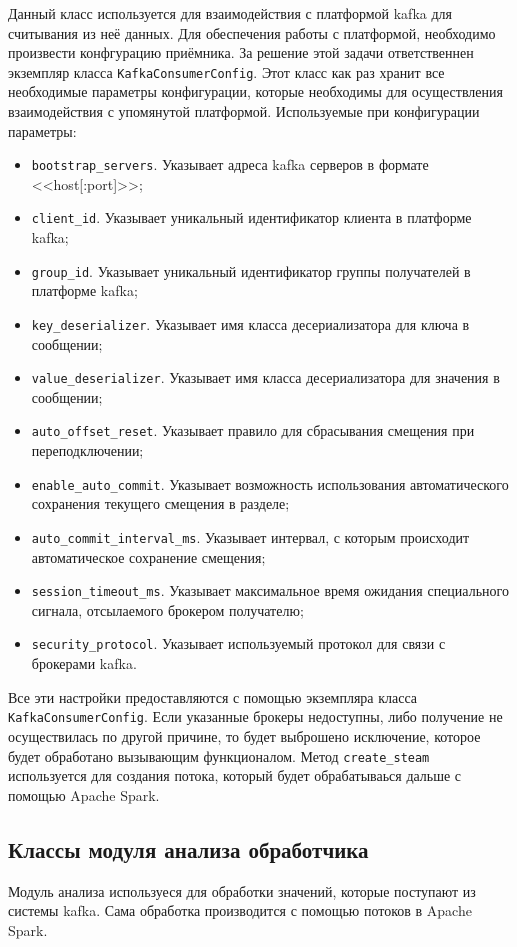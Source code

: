Данный класс используется для взаимодействия с платформой kafka для считывания из неё данных.
Для обеспечения работы с платформой, необходимо произвести конфгурацию приёмника.
За решение этой задачи ответственнен экземпляр класса \texttt{KafkaConsumerConfig}.
Этот класс как раз хранит все необходимые параметры конфигурации, которые необходимы для осуществления взаимодействия с упомянутой платформой.
Используемые при конфигурации параметры:
\begin{itemize}
    \item \texttt{bootstrap\_servers}. Указывает адреса kafka серверов в формате <<host[:port]>>;
    \item \texttt{client\_id}. Указывает уникальный идентификатор клиента в платформе kafka;
    \item \texttt{group\_id}. Указывает уникальный идентификатор группы получателей в платформе kafka;
    \item \texttt{key\_deserializer}. Указывает имя класса десериализатора для ключа в сообщении;
    \item \texttt{value\_deserializer}. Указывает имя класса десериализатора для значения в сообщении;
    \item \texttt{auto\_offset\_reset}. Указывает правило для сбрасывания смещения при переподключении;
    \item \texttt{enable\_auto\_commit}. Указывает возможность использования автоматического сохранения текущего смещения в разделе;
    \item \texttt{auto\_commit\_interval\_ms}. Указывает интервал, с которым происходит автоматическое сохранение смещения;
    \item \texttt{session\_timeout\_ms}. Указывает максимальное время ожидания специального сигнала, отсылаемого брокером получателю;
    \item \texttt{security\_protocol}. Указывает используемый протокол для связи с брокерами kafka.
\end{itemize}

Все эти настройки предоставляются с помощью экземпляра класса \texttt{KafkaConsumerConfig}.
Если указанные брокеры недоступны, либо получение не осуществилась по другой причине, то будет выброшено исключение, которое будет обработано вызывающим функционалом.
Метод \texttt{create\_steam} используется для создания потока, который будет обрабатываься дальше с помощью Apache Spark.


\subsection{Классы модуля анализа обработчика}
Модуль анализа используеся для обработки значений, которые поступают из системы kafka.
Сама обработка производится с помощью потоков в Apache Spark.

